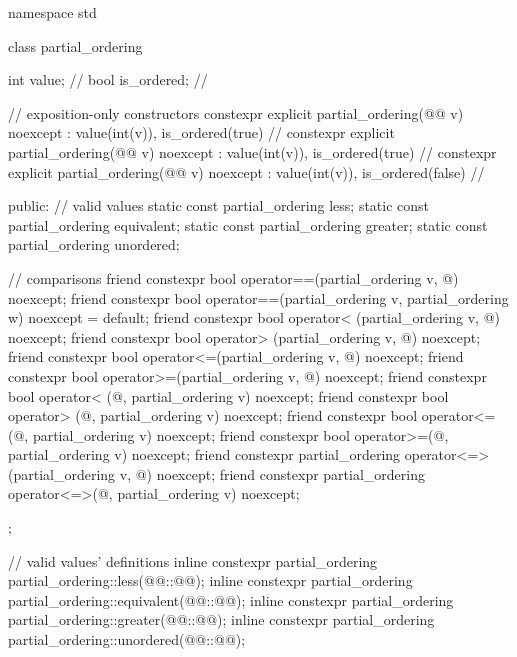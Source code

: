 %
%
%
%
%
\begin{codeblock}
namespace std {
  class partial_ordering {
    int value;          // \expos
    bool is_ordered;    // \expos

    // exposition-only constructors
    constexpr explicit
      partial_ordering(@@ v) noexcept : value(int(v)), is_ordered(true) {}      // \expos
    constexpr explicit
      partial_ordering(@@ v) noexcept : value(int(v)), is_ordered(true) {}     // \expos
    constexpr explicit
      partial_ordering(@@ v) noexcept : value(int(v)), is_ordered(false) {}   // \expos

  public:
    // valid values
    static const partial_ordering less;
    static const partial_ordering equivalent;
    static const partial_ordering greater;
    static const partial_ordering unordered;

    // comparisons
    friend constexpr bool operator==(partial_ordering v, @\unspec@) noexcept;
    friend constexpr bool operator==(partial_ordering v, partial_ordering w) noexcept = default;
    friend constexpr bool operator< (partial_ordering v, @\unspec@) noexcept;
    friend constexpr bool operator> (partial_ordering v, @\unspec@) noexcept;
    friend constexpr bool operator<=(partial_ordering v, @\unspec@) noexcept;
    friend constexpr bool operator>=(partial_ordering v, @\unspec@) noexcept;
    friend constexpr bool operator< (@\unspec@, partial_ordering v) noexcept;
    friend constexpr bool operator> (@\unspec@, partial_ordering v) noexcept;
    friend constexpr bool operator<=(@\unspec@, partial_ordering v) noexcept;
    friend constexpr bool operator>=(@\unspec@, partial_ordering v) noexcept;
    friend constexpr partial_ordering operator<=>(partial_ordering v, @\unspec@) noexcept;
    friend constexpr partial_ordering operator<=>(@\unspec@, partial_ordering v) noexcept;
  };

  // valid values' definitions
  inline constexpr partial_ordering partial_ordering::less(@@::@@);
  inline constexpr partial_ordering partial_ordering::equivalent(@@::@@);
  inline constexpr partial_ordering partial_ordering::greater(@@::@@);
  inline constexpr partial_ordering partial_ordering::unordered(@@::@@);
}
\end{codeblock}

